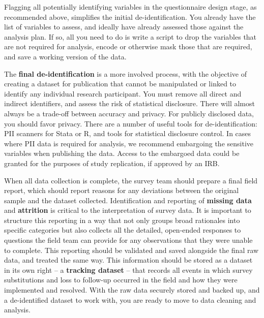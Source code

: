 Flagging all potentially identifying variables in the questionnaire design stage,
as recommended above, simplifies the initial de-identification.
You already have the list of variables to assess,
and ideally have already assessed those against the analysis plan.
If so, all you need to do is write a script to drop the variables that are not required for analysis,
 encode or otherwise mask those that are required, and save a working version of the data.

The \textbf{final de-identification} is a more involved process,
with the objective of creating a dataset for publication
that cannot be manipulated or linked to identify any individual research participant.
You must remove all direct and indirect identifiers, and assess the risk of statistical disclosure.
There will almost always be a trade-off between accuracy and privacy.
For publicly disclosed data, you should favor privacy.
There are a number of useful tools for de-identification: PII scanners for Stata
or R,
and tools for statistical disclosure control.
In cases where PII data is required for analysis,
we recommend embargoing the sensitive variables when publishing the data.
Access to the embargoed data could be granted for the purposes of study replication, if approved by an IRB.

When all data collection is complete, the survey team should prepare a final field report,
which should report reasons for any deviations between the original sample and the dataset collected.
Identification and reporting of \textbf{missing data} and \textbf{attrition}
is critical to the interpretation of survey data.
It is important to structure this reporting in a way that not only
groups broad rationales into specific categories
but also collects all the detailed, open-ended responses
to questions the field team can provide for any observations that they were unable to complete.
This reporting should be validated and saved alongside the final raw data, and treated the same way.
This information should be stored as a dataset in its own right
-- a \textbf{tracking dataset} -- that records all events in which survey substitutions
and loss to follow-up occurred in the field and how they were implemented and resolved.
With the raw data securely stored and backed up,
and a de-identified dataset to work with, you are ready to move to data cleaning and analysis.

